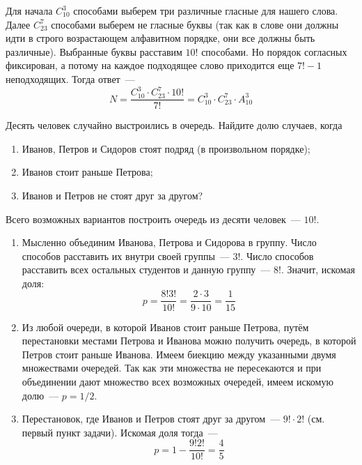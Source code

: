 \begin{Answer}
    \noindent
    Для начала $ C_{10}^3 $ способами выберем три различные гласные для нашего слова.
    Далее $ C_{23}^7 $ способами выберем не гласные буквы
    (так как в слове они должны идти в строго возрастающем алфавитном порядке, они все должны быть различные).
    Выбранные буквы расставим $ 10! $ способами.
    Но порядок согласных фиксирован, а потому на каждое подходящее слово приходится еще $ 7! - 1 $ неподходящих.
    Тогда ответ~---
    \[
        N = \frac{C_{10}^3 \cdot C_{23}^7 \cdot 10!}{7!} = C_{10}^3 \cdot C_{23}^7 \cdot A_{10}^3
    \]
\end{Answer}


\begin{Exercise}[counter=SecExercise, label={exercise:combinatorics:queue}]
    \noindent
    Десять человек случайно выстроились в очередь.
    Найдите долю случаев, когда
    \begin{enumerate}[label=\textbf{\alph*)}]
        \item Иванов, Петров и Сидоров стоят подряд (в произвольном порядке);
        \item Иванов стоит раньше Петрова;
        \item Иванов и Петров не стоят друг за другом?
    \end{enumerate}
\end{Exercise}

\begin{Answer}
    \noindent
    Всего возможных вариантов построить очередь из десяти человек~--- $ 10! $.
    \begin{enumerate}[label=\textbf{\alph*)}]
        \item
            Мысленно объединим Иванова, Петрова и Сидорова в группу.
            Число способов расставить их внутри своей группы~--- $ 3! $.
            Число способов расставить всех остальных студентов и данную группу~--- $ 8! $.
            Значит, искомая доля:
            \[
                p = \frac{8! 3!}{10!} = \frac{2 \cdot 3}{9 \cdot 10} = \frac{1}{15}
            \]
        \item
            Из любой очереди, в которой Иванов стоит раньше Петрова,
            путём перестановки местами Петрова и Иванова
            можно получить очередь, в которой Петров стоит раньше Иванова.
            Имеем биекцию между указанными двумя множествами очередей.
            Так как эти множества не пересекаются и при объединении дают множество всех возможных очередей,
            имеем искомую долю~--- $ p = 1/2 $.
        \item
            Перестановок, где Иванов и Петров стоят друг за другом~--- $ 9! \cdot 2! $
            (см. первый пункт задачи).
            Искомая доля тогда~---
            \[
                p = 1 - \frac{9! 2!}{10!} = \frac{4}{5}
            \]
    \end{enumerate}
\end{Answer}


